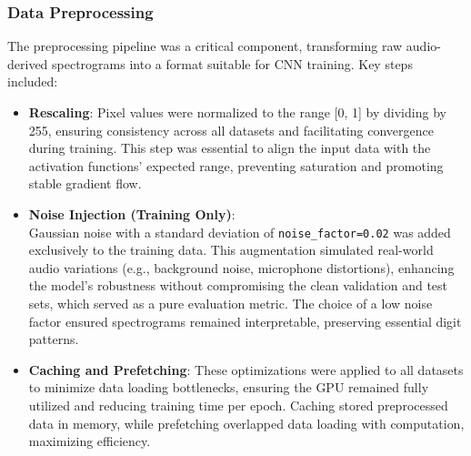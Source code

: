 \documentclass[12pt]{article}
\begin{document}
\subsubsection{Data Preprocessing}
The preprocessing pipeline was a critical component, transforming raw audio-derived spectrograms into a format suitable for CNN training. Key steps included:
\begin{itemize}
    \item \textbf{Rescaling}: Pixel values were normalized to the range [0, 1] by dividing by 255, ensuring consistency across all datasets and facilitating convergence during training. This step was essential to align the input data with the activation functions' expected range, preventing saturation and promoting stable gradient flow.
    \item \textbf{Noise Injection (Training Only)}:\\ Gaussian noise with a standard deviation of \texttt{noise\_factor=0.02} was added exclusively to the training data. This augmentation simulated real-world audio variations (e.g., background noise, microphone distortions), enhancing the model's robustness without compromising the clean validation and test sets, which served as a pure evaluation metric. The choice of a low noise factor ensured spectrograms remained interpretable, preserving essential digit patterns.
    \item \textbf{Caching and Prefetching}: These optimizations were applied to all datasets to minimize data loading bottlenecks, ensuring the GPU remained fully utilized and reducing training time per epoch. Caching stored preprocessed data in memory, while prefetching overlapped data loading with computation, maximizing efficiency.
\end{itemize}
\end{document}
